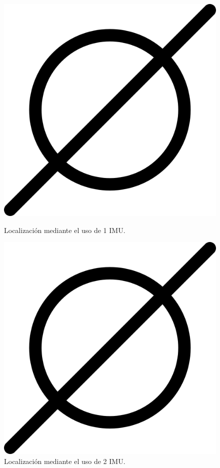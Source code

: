 \begin{figure}[htbp]
  \centering
  \begin{minipage}[b]{0.45\textwidth}
    \centering
    \includegraphics[width=\textwidth]{images/poner_foto.png}
    \caption{Localización mediante el uso de 1 IMU.}
    \label{fig:Localización_1imu}
  \end{minipage}
  \hfill
  \begin{minipage}[b]{0.45\textwidth}
    \centering
    \includegraphics[width=\textwidth]{images/poner_foto.png}
    \caption{Localización mediante el uso de 2 IMU.}
    \label{fig:localizacion_2imu}
  \end{minipage}
\end{figure}

